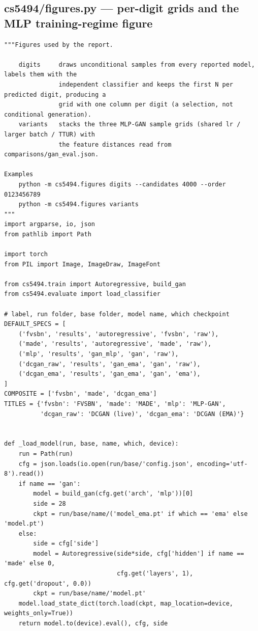 \subsection*{cs5494/figures.py --- per-digit grids and the MLP training-regime figure}
\begin{lstlisting}
"""Figures used by the report.

    digits     draws unconditional samples from every reported model, labels them with the
               independent classifier and keeps the first N per predicted digit, producing a
               grid with one column per digit (a selection, not conditional generation).
    variants   stacks the three MLP-GAN sample grids (shared lr / larger batch / TTUR) with
               the feature distances read from comparisons/gan_eval.json.

Examples
    python -m cs5494.figures digits --candidates 4000 --order 0123456789
    python -m cs5494.figures variants
"""
import argparse, io, json
from pathlib import Path

import torch
from PIL import Image, ImageDraw, ImageFont

from cs5494.train import Autoregressive, build_gan
from cs5494.evaluate import load_classifier

# label, run folder, base folder, model name, which checkpoint
DEFAULT_SPECS = [
    ('fvsbn', 'results', 'autoregressive', 'fvsbn', 'raw'),
    ('made', 'results', 'autoregressive', 'made', 'raw'),
    ('mlp', 'results', 'gan_mlp', 'gan', 'raw'),
    ('dcgan_raw', 'results', 'gan_ema', 'gan', 'raw'),
    ('dcgan_ema', 'results', 'gan_ema', 'gan', 'ema'),
]
COMPOSITE = ['fvsbn', 'made', 'dcgan_ema']
TITLES = {'fvsbn': 'FVSBN', 'made': 'MADE', 'mlp': 'MLP-GAN',
          'dcgan_raw': 'DCGAN (live)', 'dcgan_ema': 'DCGAN (EMA)'}


def _load_model(run, base, name, which, device):
    run = Path(run)
    cfg = json.loads(io.open(run/base/'config.json', encoding='utf-8').read())
    if name == 'gan':
        model = build_gan(cfg.get('arch', 'mlp'))[0]
        side = 28
        ckpt = run/base/name/('model_ema.pt' if which == 'ema' else 'model.pt')
    else:
        side = cfg['side']
        model = Autoregressive(side*side, cfg['hidden'] if name == 'made' else 0,
                               cfg.get('layers', 1), cfg.get('dropout', 0.0))
        ckpt = run/base/name/'model.pt'
    model.load_state_dict(torch.load(ckpt, map_location=device, weights_only=True))
    return model.to(device).eval(), cfg, side



\end{lstlisting}
